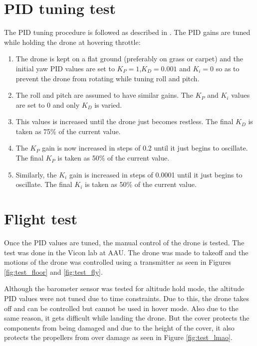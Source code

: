 \section{PID tuning test}\label{app:tuning}
The PID tuning procedure is followed as described in \cite{bib:brooking}. The PID gains are tuned while holding the drone at hovering throttle:
\begin{enumerate}
    \item The drone is kept on a flat ground (preferably on grass or carpet) and the initial yaw PID values are set to $K_P=1$,$K_D=0.001$ and $K_i=0$ so as to prevent the drone from rotating while tuning roll and pitch.
    \item The roll and pitch are assumed to have similar gains. The $K_P$ and $K_i$ values are set to 0 and only $K_D$ is varied. 
    \item This values is increased until the drone just becomes restless. The final $K_D$ is taken as 75\% of the current value.
    \item The $K_P$ gain is now increased in steps of 0.2 until it just begins to oscillate. The final $K_P$ is taken as 50\% of the current value.
    \item Similarly, the $K_i$ gain is increased in steps of 0.0001 until it just begins to oscillate. The final $K_i$ is taken as 50\% of the current value.
\end{enumerate} 


\section{Flight test}
Once the PID values are tuned, the manual control of the drone is tested. The test was done in the Vicon lab at AAU. The drone was made to takeoff and the motions of the drone was controlled using a transmitter as seen in Figures \ref{fig:test_floor} and \ref{fig:test_fly}.

Although the barometer sensor was tested for altitude hold mode, the altitude PID values were not tuned due to time constraints. Due to this, the drone takes off and can be controlled but cannot be used in hover mode. Also due to the same reason, it gets difficult while landing the drone. But the cover protects the components from being damaged and due to the height of the cover, it also protects the propellers from over damage as seen in Figure \ref{fig:test_lmao}.

